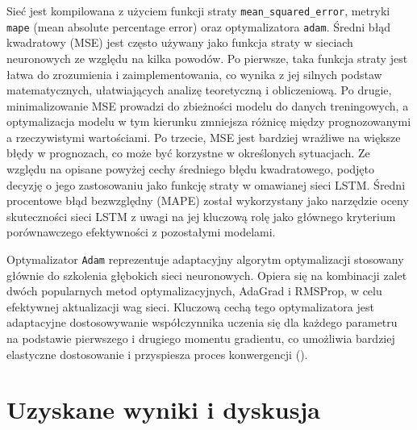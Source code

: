 \documentclass[polish, twoside, 12pt, a4paper]{article}
\theoremstyle{definition}
\theoremstyle{plain}
\theoremstyle{remark}
\newcommand{\code}[1]{\lstinline{#1}}
\begin{document}
Sieć jest kompilowana z użyciem funkcji straty \code{mean_squared_error}, metryki \code{mape} (mean absolute percentage error) oraz optymalizatora \code{adam}. Średni błąd kwadratowy (MSE) jest często używany jako funkcja straty w sieciach neuronowych ze względu na kilka powodów. Po pierwsze, taka funkcja straty jest łatwa do zrozumienia i zaimplementowania, co wynika z jej silnych podstaw matematycznych, ułatwiających analizę teoretyczną i obliczeniową. Po drugie, minimalizowanie MSE prowadzi do zbieżności modelu do danych treningowych, a optymalizacja modelu w tym kierunku zmniejsza różnicę między prognozowanymi a rzeczywistymi wartościami. Po trzecie, MSE jest bardziej wrażliwe na większe błędy w prognozach, co może być korzystne w określonych sytuacjach. Ze względu na opisane powyżej cechy średniego błędu kwadratowego, podjęto decyzję o jego zastosowaniu jako funkcję straty w omawianej sieci LSTM. Średni procentowe błąd bezwzględny (MAPE) został wykorzystany jako narzędzie oceny skuteczności sieci LSTM z uwagi na jej kluczową rolę jako głównego kryterium porównawczego efektywności z pozostałymi modelami.

Optymalizator \code{Adam} reprezentuje adaptacyjny algorytm optymalizacji stosowany głównie do szkolenia głębokich sieci neuronowych. Opiera się na kombinacji zalet dwóch popularnych metod optymalizacyjnych, AdaGrad i RMSProp, w celu efektywnej aktualizacji wag sieci. Kluczową cechą tego optymalizatora jest adaptacyjne dostosowywanie współczynnika uczenia się dla każdego parametru na podstawie pierwszego i drugiego momentu gradientu, co umożliwia bardziej elastyczne dostosowanie i przyspiesza proces konwergencji (\cite{frackiewicz2023}).


\clearpage
\section{Uzyskane wyniki i dyskusja}\label{sec:wyniki}

\end{document}
